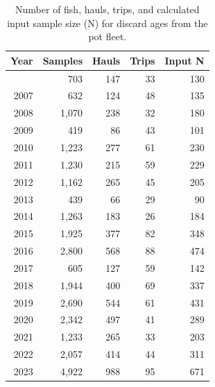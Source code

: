 \documentclass[
  english,
]{article}
\begin{document}
\begin{longtable}{rrrrr}

\caption{\label{tbl-discard-pot-age-samples}Number of fish, hauls,
trips, and calculated input sample size (N) for discard ages from the
pot fleet.}

\tabularnewline

\toprule
Year & Samples & Hauls & Trips & Input N \\ 
\midrule\addlinespace[2.5pt]
2006 & 703 & 147 & 33 & 130 \\ 
2007 & 632 & 124 & 48 & 135 \\ 
2008 & 1,070 & 238 & 32 & 180 \\ 
2009 & 419 & 86 & 43 & 101 \\ 
2010 & 1,223 & 277 & 61 & 230 \\ 
2011 & 1,230 & 215 & 59 & 229 \\ 
2012 & 1,162 & 265 & 45 & 205 \\ 
2013 & 439 & 66 & 29 & 90 \\ 
2014 & 1,263 & 183 & 26 & 184 \\ 
2015 & 1,925 & 377 & 82 & 348 \\ 
2016 & 2,800 & 568 & 88 & 474 \\ 
2017 & 605 & 127 & 59 & 142 \\ 
2018 & 1,944 & 400 & 69 & 337 \\ 
2019 & 2,690 & 544 & 61 & 431 \\ 
2020 & 2,342 & 497 & 41 & 289 \\ 
2021 & 1,233 & 265 & 33 & 203 \\ 
2022 & 2,057 & 414 & 44 & 311 \\ 
2023 & 4,922 & 988 & 95 & 671 \\ 
\bottomrule

\end{longtable}

\endgroup

\pagebreak

\begingroup
\fontsize{9.0pt}{11.0pt}\selectfont
\end{document}
